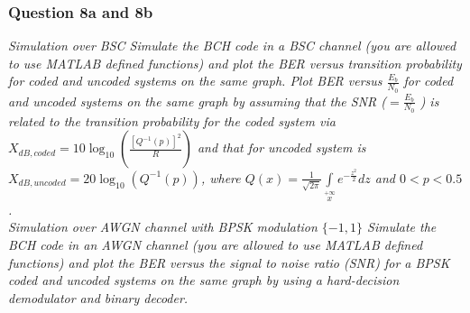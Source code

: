 \documentclass[a4paper]{article}
\begin{document}
\subsubsection{Question 8a and 8b} \textit{Simulation over BSC Simulate the BCH code in a BSC channel (you are allowed to use MATLAB defined functions) and plot the BER versus transition probability for coded and uncoded systems on the same graph. Plot BER versus $\frac{E_b}{N_0}$ for coded and uncoded systems on the same graph by assuming that the SNR ($ = \frac{E_b}{N_0}$ ) is related to the transition probability for the coded system via $X_{dB,coded} = 10 \log_{10}(\frac{[Q^{- 1} (p)]^2}{R}) $ and that for uncoded system is $X_{dB,uncoded} = 20\log_{10}(Q^{- 1} (p)) $, where $Q(x) = \frac{1}{\sqrt{2 \pi}} \int\limits_{x}\limits^{+\infty} e^{ -\frac{z^2}{2}} dz $ and $0 < p < 0.5$.}\\
\textit{Simulation over AWGN channel with BPSK modulation $\{−1, 1\}$ Simulate the BCH code in an AWGN channel (you are allowed to use MATLAB defined functions) and plot the BER versus the signal to noise ratio (SNR) for a BPSK coded and uncoded systems on the same graph by using a hard-decision demodulator and binary decoder.}\\
\\

\end{document}

